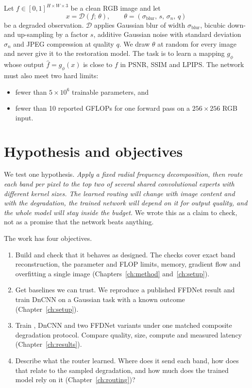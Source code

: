 Let $f \in [0,1]^{H\times W\times3}$ be a clean RGB image and let
\begin{equation}
	x = \mathcal{D}(f;\, \theta), \qquad
	\theta = (\sigma_\text{blur},\, s,\, \sigma_n,\, q)
	\label{eq:degradation}
\end{equation}
be a degraded observation. $\mathcal{D}$ applies Gaussian blur of width
$\sigma_\text{blur}$, bicubic down- and up-sampling by a factor $s$, additive
Gaussian noise with standard deviation $\sigma_n$ and JPEG compression at
quality $q$. We draw $\theta$ at random for every image and never give it to
the restoration model. The task is to learn a mapping $g_\phi$ whose output
$\hat f = g_\phi(x)$ is close to $f$ in PSNR, SSIM and LPIPS. The network
must also meet two hard limits:
\begin{itemize}
	\item fewer than $5\times10^{6}$ trainable parameters, and
	\item fewer than 10 reported GFLOPs for one forward pass on a
	$256\times256$ RGB input.
\end{itemize}

\section{Hypothesis and objectives}\label{sec:objectives}

We test one hypothesis. \emph{Apply a fixed radial frequency decomposition,
then route each band per pixel to the top two of several shared
convolutional experts with different kernel sizes. The learned routing will
change with image content and with the degradation, the trained network will
depend on it for output quality, and the whole model will stay inside the
budget.} We wrote this as a claim to check, not as a promise that the network
beats anything.

The work has four objectives.
\begin{enumerate}
	\item[\textbf{O1}] Build \fcsg{} and check that it behaves as designed.
	The checks cover exact band reconstruction, the parameter and FLOP
	limits, memory, gradient flow and overfitting a single image
	(Chapters~\ref{ch:method} and~\ref{ch:setup}).
	\item[\textbf{O2}] Get baselines we can trust. We reproduce a published
	FFDNet result and train DnCNN on a Gaussian task with a known outcome
	(Chapter~\ref{ch:setup}).
	\item[\textbf{O3}] Train \fcsg{}, DnCNN and two FFDNet variants under one
	matched composite degradation protocol. Compare quality, size, compute and
	measured latency (Chapter~\ref{ch:results}).
	\item[\textbf{O4}] Describe what the router learned. Where does it send
	each band, how does that relate to the sampled degradation, and how much
	does the trained model rely on it (Chapter~\ref{ch:routing})?
\end{enumerate}

